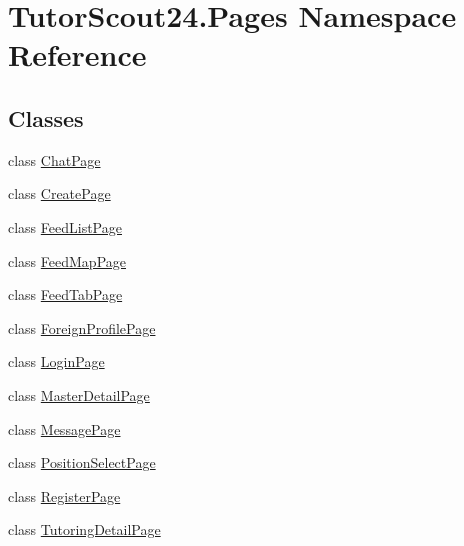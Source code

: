 \hypertarget{namespace_tutor_scout24_1_1_pages}{}\section{Tutor\+Scout24.\+Pages Namespace Reference}
\label{namespace_tutor_scout24_1_1_pages}
\subsection*{Classes}
\begin{DoxyCompactItemize}
\item 
class \mbox{\hyperlink{class_tutor_scout24_1_1_pages_1_1_chat_page}{Chat\+Page}}
\item 
class \mbox{\hyperlink{class_tutor_scout24_1_1_pages_1_1_create_page}{Create\+Page}}
\item 
class \mbox{\hyperlink{class_tutor_scout24_1_1_pages_1_1_feed_list_page}{Feed\+List\+Page}}
\item 
class \mbox{\hyperlink{class_tutor_scout24_1_1_pages_1_1_feed_map_page}{Feed\+Map\+Page}}
\item 
class \mbox{\hyperlink{class_tutor_scout24_1_1_pages_1_1_feed_tab_page}{Feed\+Tab\+Page}}
\item 
class \mbox{\hyperlink{class_tutor_scout24_1_1_pages_1_1_foreign_profile_page}{Foreign\+Profile\+Page}}
\item 
class \mbox{\hyperlink{class_tutor_scout24_1_1_pages_1_1_login_page}{Login\+Page}}
\item 
class \mbox{\hyperlink{class_tutor_scout24_1_1_pages_1_1_master_detail_page}{Master\+Detail\+Page}}
\item 
class \mbox{\hyperlink{class_tutor_scout24_1_1_pages_1_1_message_page}{Message\+Page}}
\item 
class \mbox{\hyperlink{class_tutor_scout24_1_1_pages_1_1_position_select_page}{Position\+Select\+Page}}
\item 
class \mbox{\hyperlink{class_tutor_scout24_1_1_pages_1_1_register_page}{Register\+Page}}
\item 
class \mbox{\hyperlink{class_tutor_scout24_1_1_pages_1_1_tutoring_detail_page}{Tutoring\+Detail\+Page}}
\end{DoxyCompactItemize}
